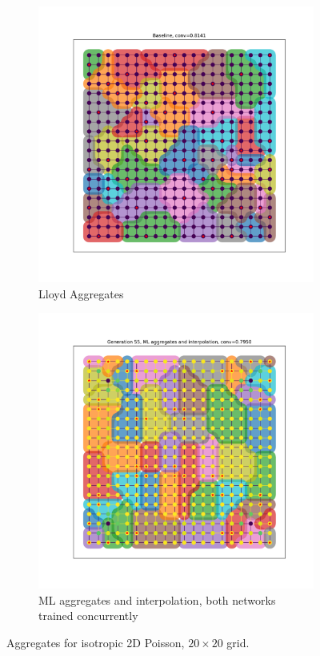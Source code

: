 \documentclass{article}
\begin{document}
\begin{figure}[b]
  \centering
  \begin{subfigure}[t]{0.49\textwidth}
    \centering
    \includegraphics[width=\textwidth]{isotropic_large_lloyd.pdf}
    \caption{Lloyd Aggregates}
  \end{subfigure}
  \begin{subfigure}[t]{0.49\textwidth}
    \centering
    \includegraphics[width=\textwidth]{isotropic_large_full.pdf}
    \caption{ML aggregates and interpolation, both networks trained concurrently}
  \end{subfigure}
  \caption{Aggregates for isotropic 2D Poisson, $20\times 20$ grid.}
  \label{fig:2d_anisotropic}
\end{figure}
\end{document}
